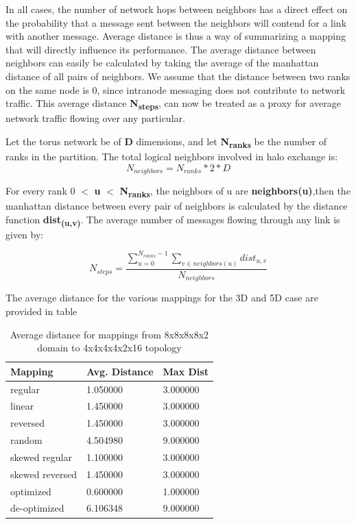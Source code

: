 \documentclass{acm_proc_article-sp}
\begin{document}
In all cases, the number of network hops between neighbors has a
direct effect on the probability that a message sent between the
neighbors will contend for a link with another message.
Average distance is thus a way of summarizing a mapping that will
directly influence its performance.
The average distance between neighbors can easily be calculated by taking the average of the manhattan distance of all pairs of neighbors.
We assume that the distance between two ranks on the same node is 0, since intranode messaging does not contribute to network traffic.
This average distance \textbf{N\textsubscript{steps}}, can now be treated as a proxy for average network traffic flowing over any particular.


Let the torus network be of \textbf{D} dimensions, and let \textbf{N\textsubscript{ranks}} be the number of ranks in the partition.
The total logical neighbors involved in halo exchange is:
\begin{equation}
  N_{neighbors} = N_{ranks} * 2 * D
\end{equation}

For every rank 0 $<$ \textbf{u} $<$ \textbf{N\textsubscript{ranks}}, the neighbors of u are \textbf{neighbors(u)},then the manhattan distance
between every pair of neighbors is calculated by the distance function \textbf{dist\textsubscript{(u,v)}}.
The average number of messages flowing through any link is given by:

\begin{equation}
  N_{steps} = \frac{ \sum\limits^{N_{ranks} - 1}_{u \mathop =0} \sum\limits_{v\in{neighbors(u)}} dist_{u,v}  }  {N_{neighbors}}
\end{equation}



The average distance for the various mappings for the 3D and 5D case are provided in table


\begin{table}
  \caption{Average distance for mappings from 8x8x8x8x2 domain to 4x4x4x4x2x16 topology}
  {\footnotesize
    \begin{tabular}{| l | l | p{1.5cm} |}
    \hline
    Mapping         & Avg. Distance & Max Dist\\ \hline
    regular         & 1.050000 & 3.000000\\ \hline
    linear          & 1.450000 & 3.000000\\ \hline
    reversed        & 1.450000 & 3.000000\\ \hline
    random          & 4.504980 & 9.000000\\ \hline
    skewed regular  & 1.100000 & 3.000000\\ \hline
    skewed reversed & 1.450000 & 3.000000\\ \hline
    optimized       & 0.600000 & 1.000000\\ \hline
    de-optimized    & 6.106348 & 9.000000\\ \hline
    \hline
    \end{tabular}
  }
\end{table}
\end{document}

